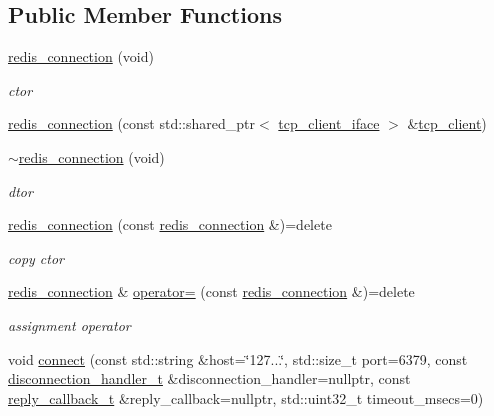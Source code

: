 \subsection*{Public Member Functions}
\begin{DoxyCompactItemize}
\item 
\hyperlink{classcpp__redis_1_1network_1_1redis__connection_aee0302e4ff9c9b5b2e7f467d869d45f7}{redis\+\_\+connection} (void)
\begin{DoxyCompactList}\small\item\em ctor \end{DoxyCompactList}\item 
\hyperlink{classcpp__redis_1_1network_1_1redis__connection_a6880cfb2e1b037fcdaa5f0a6d515b375}{redis\+\_\+connection} (const std\+::shared\+\_\+ptr$<$ \hyperlink{classcpp__redis_1_1network_1_1tcp__client__iface}{tcp\+\_\+client\+\_\+iface} $>$ \&\hyperlink{classcpp__redis_1_1network_1_1tcp__client}{tcp\+\_\+client})
\item 
\hyperlink{classcpp__redis_1_1network_1_1redis__connection_a9d392191ce262eddd5570b57e07aa051}{$\sim$redis\+\_\+connection} (void)
\begin{DoxyCompactList}\small\item\em dtor \end{DoxyCompactList}\item 
\hyperlink{classcpp__redis_1_1network_1_1redis__connection_a2bdd38bbfd5d97aeca8e433465c4d621}{redis\+\_\+connection} (const \hyperlink{classcpp__redis_1_1network_1_1redis__connection}{redis\+\_\+connection} \&)=delete
\begin{DoxyCompactList}\small\item\em copy ctor \end{DoxyCompactList}\item 
\hyperlink{classcpp__redis_1_1network_1_1redis__connection}{redis\+\_\+connection} \& \hyperlink{classcpp__redis_1_1network_1_1redis__connection_a54a4c28ad1b9e9f3bac2854fddf4e30d}{operator=} (const \hyperlink{classcpp__redis_1_1network_1_1redis__connection}{redis\+\_\+connection} \&)=delete
\begin{DoxyCompactList}\small\item\em assignment operator \end{DoxyCompactList}\item 
void \hyperlink{classcpp__redis_1_1network_1_1redis__connection_af105573e46eadbc34a9f5907832df19f}{connect} (const std\+::string \&host=\char`\"{}127...\char`\"{}, std\+::size\+\_\+t port=6379, const \hyperlink{classcpp__redis_1_1network_1_1redis__connection_aba1a229a3d36a5540a80776ed0cf9a44}{disconnection\+\_\+handler\+\_\+t} \&disconnection\+\_\+handler=nullptr, const \hyperlink{classcpp__redis_1_1network_1_1redis__connection_a40f4b55a3103b7436e34211893377245}{reply\+\_\+callback\+\_\+t} \&reply\+\_\+callback=nullptr, std\+::uint32\+\_\+t timeout\+\_\+msecs=0)

\end{DoxyCompactItemize}
